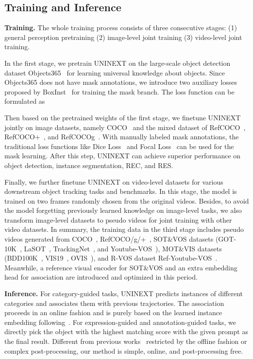\documentclass[10pt,twocolumn,letterpaper]{article}
\begin{document}
\subsection{Training and Inference}
\label{sub-sec-train-infer}
\textbf{Training.} The whole training process consists of three consecutive stages: (1) general perception pretraining (2) image-level joint training (3) video-level joint training. 

In the first stage, we pretrain UNINEXT on the large-scale object detection dataset Objects365~\cite{Objects365} for learning universal knowledge about objects. Since Objects365 does not have mask annotations, we introduce two auxiliary losses proposed by BoxInst~\cite{BoxInst} for training the mask branch. The loss function can be formulated as 

Then based on the pretrained weights of the first stage, we finetune UNINEXT jointly on image datasets, namely COCO~\cite{COCO} and the mixed dataset of RefCOCO~\cite{RefCOCO&plus}, RefCOCO+~\cite{RefCOCO&plus}, and RefCOCOg~\cite{RefCOCOg-umd}. With manually labeled mask annotations, the traditional loss functions like Dice Loss~\cite{DiceLoss} and Focal Loss~\cite{RetinaNet} can be used for the mask learning. After this step, UNINEXT can achieve superior performance on object detection, instance segmentation, REC, and RES. 

Finally, we further finetune UNINEXT on video-level datasets for various downstream object tracking tasks and benchmarks. In this stage, the model is trained on two frames randomly chosen from the original videos. Besides, to avoid the model forgetting previously learned knowledge on image-level tasks, we also transform image-level datasets to pseudo videos for joint training with other video datasets. In summary, the training data in the third stage includes pseudo videos generated from COCO~\cite{COCO}, RefCOCO/g/+~\cite{RefCOCO&plus,RefCOCOg-umd,RefCOCO&plus}, SOT\&VOS datasets (GOT-10K~\cite{GOT10K}, LaSOT~\cite{LaSOT}, TrackingNet~\cite{trackingnet}, and Youtube-VOS~\cite{YoutubeVOS}), MOT\&VIS datasets (BDD100K~\cite{BDD100K}, VIS19~\cite{VIS}, OVIS~\cite{OVIS}), and R-VOS dataset Ref-Youtube-VOS~\cite{URVOS}. Meanwhile, a reference visual encoder for SOT\&VOS and an extra embedding head for association are introduced and optimized in this period. 

\textbf{Inference.} For category-guided tasks, UNINEXT predicts instances of different categories and associates them with previous trajectories. The association proceeds in an online fashion and is purely based on the learned instance embedding following~\cite{QDTrack,IDOL}. For expression-guided and annotation-guided tasks, we directly pick the object with the highest matching score with the given prompt as the final result. Different from previous works~\cite{ReferFormer,SiamRCNN} restricted by the offline fashion or complex post-processing, our method is simple, online, and post-processing free. 
\end{document}
